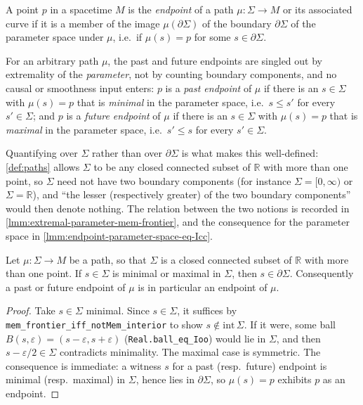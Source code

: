 \begin{definition}[Endpoints]
    \label{def:endpoints}
    \leanok
    A point $p$ in a spacetime $M$ is the \textit{endpoint} of a path $\mu : \Sigma \to M$ or its associated curve if it is a member of the image $\mu(\partial\Sigma)$ of the boundary $\partial\Sigma$ of the parameter space under $\mu$, i.e.\ if $\mu(s) = p$ for some $s \in \partial\Sigma$.

    For an arbitrary path $\mu$, the past and future endpoints are singled out by extremality of the \emph{parameter}, not by counting boundary components, and no causal or smoothness input enters: $p$ is a \textit{past endpoint} of $\mu$ if there is an $s \in \Sigma$ with $\mu(s) = p$ that is \emph{minimal} in the parameter space, i.e.\ $s \le s'$ for every $s' \in \Sigma$; and $p$ is a \textit{future endpoint} of $\mu$ if there is an $s \in \Sigma$ with $\mu(s) = p$ that is \emph{maximal} in the parameter space, i.e.\ $s' \le s$ for every $s' \in \Sigma$.

    Quantifying over $\Sigma$ rather than over $\partial\Sigma$ is what makes this well-defined: \ref{def:paths} allows $\Sigma$ to be any closed connected subset of $\mathbb{R}$ with more than one point, so $\Sigma$ need not have two boundary components (for instance $\Sigma = [0,\infty)$ or $\Sigma = \mathbb{R}$), and ``the lesser (respectively greater) of the two boundary components'' would then denote nothing. The relation between the two notions is recorded in \ref{lmm:extremal-parameter-mem-frontier}, and the consequence for the parameter space in \ref{lmm:endpoint-parameter-space-eq-Icc}.
\end{definition}

\begin{lemma}
    \label{lmm:extremal-parameter-mem-frontier}
    Let $\mu : \Sigma \to M$ be a path, so that $\Sigma$ is a closed connected subset of $\mathbb{R}$ with more than one point. If $s \in \Sigma$ is minimal or maximal in $\Sigma$, then $s \in \partial\Sigma$. Consequently a past or future endpoint of $\mu$ is in particular an endpoint of $\mu$.
\end{lemma}
\begin{proof}
    Take $s \in \Sigma$ minimal. Since $s \in \Sigma$, it suffices by \texttt{mem\_frontier\_iff\_notMem\_interior} to show $s \notin \mathrm{int}\,\Sigma$. If it were, some ball $B(s,\varepsilon) = (s-\varepsilon, s+\varepsilon)$ (\texttt{Real.ball\_eq\_Ioo}) would lie in $\Sigma$, and then $s - \varepsilon/2 \in \Sigma$ contradicts minimality. The maximal case is symmetric. The consequence is immediate: a witness $s$ for a past (resp.\ future) endpoint is minimal (resp.\ maximal) in $\Sigma$, hence lies in $\partial\Sigma$, so $\mu(s) = p$ exhibits $p$ as an endpoint.
\end{proof}

